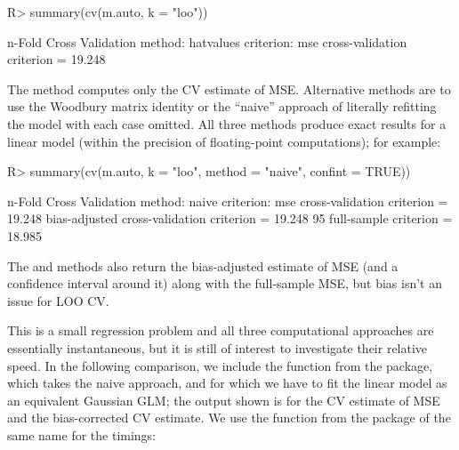 \documentclass[
]{jss}
\begin{document}
\begin{CodeChunk}
\begin{CodeInput}
R> summary(cv(m.auto, k = "loo"))
\end{CodeInput}
\begin{CodeOutput}
n-Fold Cross Validation
method: hatvalues
criterion: mse
cross-validation criterion = 19.248
\end{CodeOutput}
\end{CodeChunk}

The  method computes only the CV estimate of MSE.
Alternative methods are to use the Woodbury matrix identity or the
``naive'' approach of literally refitting the model with each case
omitted. All three methods produce exact results for a linear model
(within the precision of floating-point computations); for example:

\begin{CodeChunk}
\begin{CodeInput}
R> summary(cv(m.auto, k = "loo", method = "naive", confint = TRUE))
\end{CodeInput}
\begin{CodeOutput}
n-Fold Cross Validation
method: naive
criterion: mse
cross-validation criterion = 19.248
bias-adjusted cross-validation criterion = 19.248
95%
full-sample criterion = 18.985
\end{CodeOutput}
\end{CodeChunk}

The  and  methods also return the
bias-adjusted estimate of MSE (and a confidence interval around it)
along with the full-sample MSE, but bias isn't an issue for LOO CV.

This is a small regression problem and all three computational
approaches are essentially instantaneous, but it is still of interest to
investigate their relative speed. In the following comparison, we
include the  function from the  package, which
takes the naive approach, and for which we have to fit the linear model
as an equivalent Gaussian GLM; the output shown is for the CV estimate
of MSE and the bias-corrected CV estimate. We use the
 function from the package of the same name
\citep{Mersmann:2023} for the timings:
\end{document}
